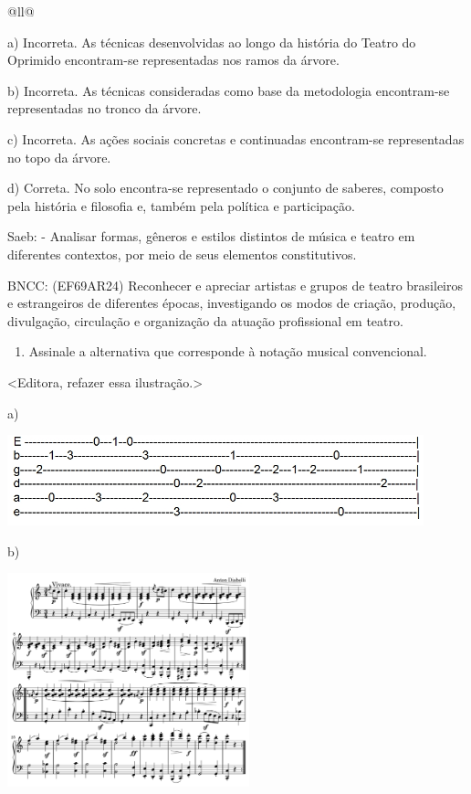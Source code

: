 \begin{itemize}
\begin{itemize}
\begin{escolha}[]{@{}ll@{}}
{{{{{{{{a) Incorreta. As técnicas desenvolvidas ao longo da história do Teatro
do Oprimido encontram-se representadas nos ramos da árvore.

b) Incorreta. As técnicas consideradas como base da metodologia
encontram-se representadas no tronco da árvore.

c) Incorreta. As ações sociais concretas e continuadas encontram-se
representadas no topo da árvore.

d) Correta. No solo encontra-se representado o conjunto de saberes,
composto pela história e filosofia e, também pela política e
participação.

Saeb: - Analisar formas, gêneros e estilos distintos de música e teatro
em diferentes contextos, por meio de seus elementos constitutivos.

BNCC: (EF69AR24) Reconhecer e apreciar artistas e grupos de teatro
brasileiros e estrangeiros de diferentes épocas, investigando os modos
de criação, produção, divulgação, circulação e organização da atuação
profissional em teatro.

\begin{enumerate}
\def\labelenumi{\arabic{enumi}.}
\item
  Assinale a alternativa que corresponde à notação musical convencional.
\end{enumerate}

\textless{}Editora, refazer essa ilustração.\textgreater{}

a)

\includegraphics[width=4.75000in,height=1.03125in]{media/image31.jpeg}

b)

\includegraphics[width=2.76042in,height=2.43750in]{media/image32.png}

}}}}}}}}
\end{escolha}
\end{itemize}
\end{itemize}

